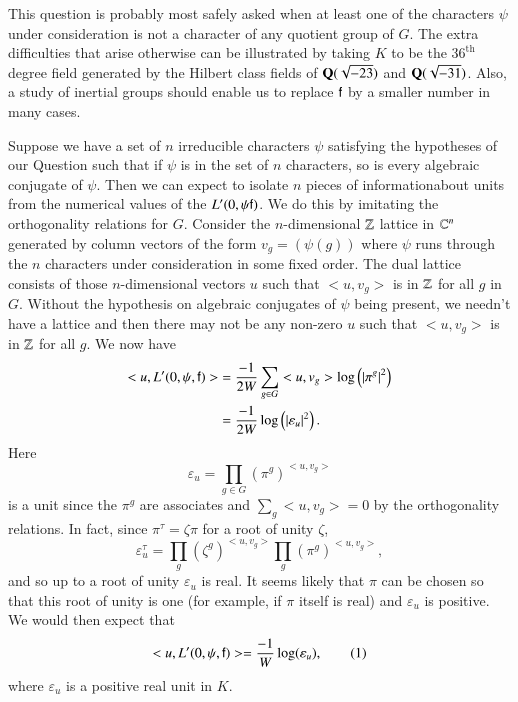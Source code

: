 This question is probably most safely asked when at least one of the
characters $\psi$ under consideration is not a character of any quotient group of $G$. The extra difficulties that arise otherwise can be illustrated by taking $K$ to be the $36^{\text{th}}$ degree field generated by the Hilbert class fields  of $\mathbf{Q} (\sqrt{-23})$ and $\mathbf{Q} (\sqrt{-31})$. Also, a study of inertial groups should enable us to replace $\mathsf{f}$ by a smaller number in many cases.

Suppose we have a set of $n$ irreducible characters $\psi$ satisfying the hypotheses of our Question such that if $\psi$ is in the set of $n$ characters, so is every algebraic conjugate of $\psi$. Then we can expect to isolate $n$ pieces of information\pageoriginale about units from the numerical values of the $L' (0, \psi \mathsf{f})$. We do this by imitating the orthogonality relations for $G$. Consider the $n$-dimensional $\mathbb{Z}$ lattice in $\mathbb{C}^n$ generated by column vectors of the form $v_g = (\psi (g))$ where $\psi$ runs through the $n$ characters under consideration in some fixed order. The dual lattice consists of those $n$-dimensional vectors $u$ such that $< u, v_g>$ is in $\mathbb{Z}$ for all $g$ in $G$. Without the hypothesis on algebraic conjugates of $\psi$ being present, we needn't have a lattice and then there may not be any non-zero $u$ such that $< u, v_g>$ is in $\mathbb{Z}$ for all $g$. We now have 
\begin{align*}
< u, L' (0, \psi, \mathsf{f}) > & = \frac{-1}{2W} \sum\limits_{g \in G} <u, v_g> \log \left(\left|\pi^g \right|^2 \right)\\
& = \frac{-1}{2W} \log \left(\left|\varepsilon_u \right|^2 \right).
\end{align*}
Here
$$
\varepsilon_u = \prod\limits_{g \in G} (\pi^g)^{<u, v_g>}
$$
is a unit since the $\pi^g$ are associates and $\sum\limits_g <u, v_g> =0$ by the orthogonality relations. In fact, since $\pi^\tau = \zeta \pi$ for a root of unity $\zeta$,
$$
\varepsilon^\tau_u = \prod\limits_g (\zeta^g)^{<u, v_g>} \prod\limits_{g} (\pi^g)^{<u, v_g>},
$$
and so up to a root of unity $\varepsilon_u$ is real. It seems likely that $\pi$ can be chosen so that this root of unity is one (for example, if $\pi$ itself is real) and $\varepsilon_u$ is positive. We would then expect that 
\begin{equation*}
<u, L' (0, \psi, \mathsf{f})> = \frac{-1}{W} \log (\varepsilon_u),\tag{1} \label{art9-eq1}
\end{equation*}
where $\varepsilon_u$ is a positive real unit in $K$.

